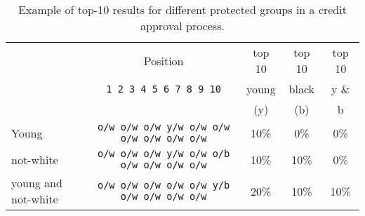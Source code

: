\begin{table}[t]
	\caption{Example of top-10 results for different protected groups in a credit approval process.
		\label{tbl:multinomial_intro_example}}
	
	\centering\small\begin{tabular}{lcccc}\toprule
		& Position					  & top 10 & top 10  & top 10 \\
		& \texttt{1 2 3 4 5 6 7 8 9 10} & young & black & y \& \\
		&                               &  (y)  & (b)  &  b \\
		\midrule
		Young  & \texttt{o/w o/w o/w y/w o/w o/w o/w o/w o/w o/w} & 10\% & 0\% & 0\% \\
		not-white & \texttt{o/w o/w o/w y/w o/w o/b o/w o/w o/w o/w} & 10\% & 10\% & 0\% \\
		young and not-white & \texttt{o/w o/w o/w o/w o/w y/b o/w o/w o/w o/w} & 20\% & 10\% & 10\% \\
		\bottomrule
	\end{tabular}
	
\end{table}


